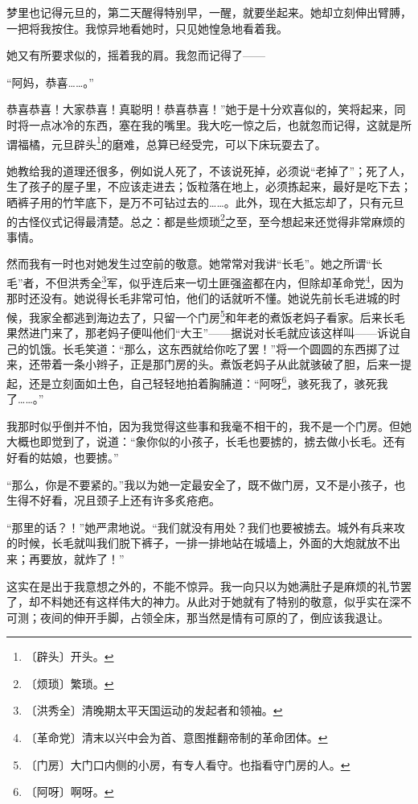 \documentclass[12pt,UTF-8,openany]{ctexbook}
\begin{document}
\begin{normalsize}
    梦里也记得元旦的，第二天醒得特别早，一醒，就要坐起来。她却立刻伸出臂膊，一把将我按住。我惊异地看她时，只见她惶急地看着我。
    
    她又有所要求似的，摇着我的肩。我忽而记得了——
    
    “阿妈，恭喜……。”
    
    恭喜恭喜！大家恭喜！真聪明！恭喜恭喜！”她于是十分欢喜似的，笑将起来，同时将一点冰冷的东西，塞在我的嘴里。我大吃一惊之后，也就忽而记得，这就是所谓福橘，元旦辟头\footnote{〔辟头〕开头。}的磨难，总算已经受完，可以下床玩耍去了。
    
    她教给我的道理还很多，例如说人死了，不该说死掉，必须说“老掉了”；死了人，生了孩子的屋子里，不应该走进去；饭粒落在地上，必须拣起来，最好是吃下去；晒裤子用的竹竿底下，是万不可钻过去的……。此外，现在大抵忘却了，只有元旦的古怪仪式记得最清楚。总之：都是些烦琐\footnote{〔烦琐〕繁琐。}之至，至今想起来还觉得非常麻烦的事情。
    
    然而我有一时也对她发生过空前的敬意。她常常对我讲“长毛”。她之所谓“长毛”者，不但洪秀全\footnote{〔洪秀全〕清晚期太平天国运动的发起者和领袖。}军，似乎连后来一切土匪强盗都在内，但除却革命党\footnote{〔革命党〕清末以兴中会为首、意图推翻帝制的革命团体。}，因为那时还没有。她说得长毛非常可怕，他们的话就听不懂。她说先前长毛进城的时候，我家全都逃到海边去了，只留一个门房\footnote{〔门房〕大门口内侧的小房，有专人看守。也指看守门房的人。}和年老的煮饭老妈子看家。后来长毛果然进门来了，那老妈子便叫他们“大王”——据说对长毛就应该这样叫——诉说自己的饥饿。长毛笑道：“那么，这东西就给你吃了罢！”将一个圆圆的东西掷了过来，还带着一条小辫子，正是那门房的头。煮饭老妈子从此就骇破了胆，后来一提起，还是立刻面如土色，自己轻轻地拍着胸脯道：“阿呀\footnote{〔阿呀〕啊呀。}，骇死我了，骇死我了……。”
    
    我那时似乎倒并不怕，因为我觉得这些事和我毫不相干的，我不是一个门房。但她大概也即觉到了，说道：“象你似的小孩子，长毛也要掳的，掳去做小长毛。还有好看的姑娘，也要掳。”
    
    “那么，你是不要紧的。”我以为她一定最安全了，既不做门房，又不是小孩子，也生得不好看，况且颈子上还有许多炙疮疤。
    
    “那里的话？！”她严肃地说。“我们就没有用处？我们也要被掳去。城外有兵来攻的时候，长毛就叫我们脱下裤子，一排一排地站在城墙上，外面的大炮就放不出来；再要放，就炸了！”
    
    这实在是出于我意想之外的，不能不惊异。我一向只以为她满肚子是麻烦的礼节罢了，却不料她还有这样伟大的神力。从此对于她就有了特别的敬意，似乎实在深不可测；夜间的伸开手脚，占领全床，那当然是情有可原的了，倒应该我退让。
    

\end{normalsize}
\end{document}
